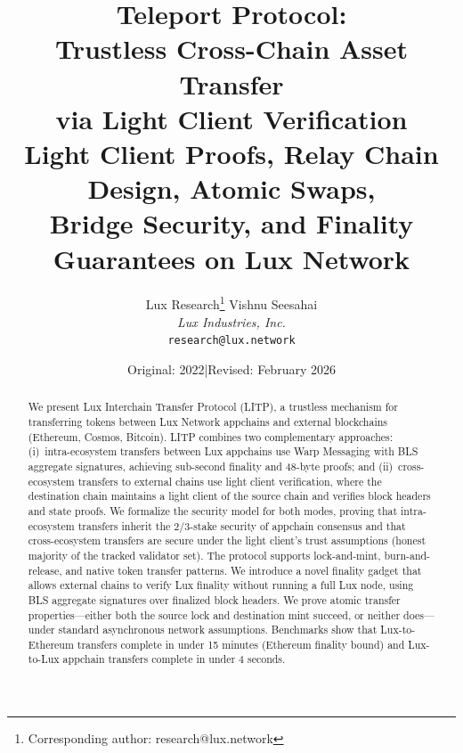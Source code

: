 \documentclass[11pt,a4paper]{article}
\title{\textbf{Teleport Protocol:\\Trustless Cross-Chain Asset Transfer\\via Light Client Verification}\\[6pt]
\large Light Client Proofs, Relay Chain Design, Atomic Swaps,\\Bridge Security, and Finality Guarantees on Lux Network}
\author{
Lux Research\thanks{Corresponding author: research@lux.network}
\quad
Vishnu Seesahai\\
\textit{Lux Industries, Inc.}\\
\texttt{research@lux.network}
}
\date{Original: 2022\quad|\quad Revised: February 2026}
\begin{document}
\luxcoverpage

\begin{abstract}
We present Lux Interchain Transfer Protocol (LITP), a trustless mechanism for transferring tokens between Lux Network appchains and external blockchains (Ethereum, Cosmos, Bitcoin). LITP combines two complementary approaches: (i)~intra-ecosystem transfers between Lux appchains use Warp Messaging with BLS aggregate signatures, achieving sub-second finality and 48-byte proofs; and (ii)~cross-ecosystem transfers to external chains use light client verification, where the destination chain maintains a light client of the source chain and verifies block headers and state proofs. We formalize the security model for both modes, proving that intra-ecosystem transfers inherit the $2/3$-stake security of appchain consensus and that cross-ecosystem transfers are secure under the light client's trust assumptions (honest majority of the tracked validator set). The protocol supports lock-and-mint, burn-and-release, and native token transfer patterns. We introduce a novel finality gadget that allows external chains to verify Lux finality without running a full Lux node, using BLS aggregate signatures over finalized block headers. We prove atomic transfer properties---either both the source lock and destination mint succeed, or neither does---under standard asynchronous network assumptions. Benchmarks show that Lux-to-Ethereum transfers complete in under 15 minutes (Ethereum finality bound) and Lux-to-Lux appchain transfers complete in under 4 seconds.
\end{abstract}















\end{document}
